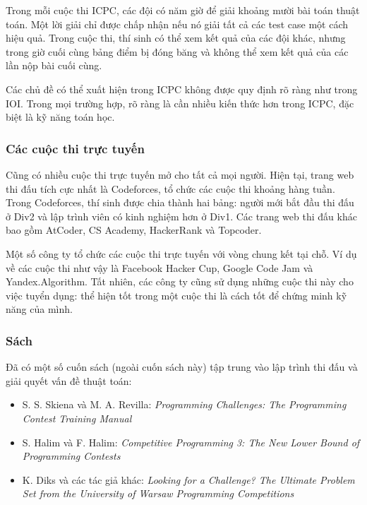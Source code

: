 Trong mỗi cuộc thi ICPC, các đội có năm giờ để
giải khoảng mười bài toán thuật toán.
Một lời giải chỉ được chấp nhận nếu nó giải
tất cả các test case một cách hiệu quả.
Trong cuộc thi, thí sinh có thể xem kết quả của các đội khác,
nhưng trong giờ cuối cùng bảng điểm bị đóng băng và
không thể xem kết quả của các lần nộp bài cuối cùng.

Các chủ đề có thể xuất hiện trong ICPC không được
quy định rõ ràng như trong IOI.
Trong mọi trường hợp, rõ ràng là cần nhiều kiến thức hơn
trong ICPC, đặc biệt là kỹ năng toán học.

\subsubsection{Các cuộc thi trực tuyến}

Cũng có nhiều cuộc thi trực tuyến mở cho tất cả mọi người.
Hiện tại, trang web thi đấu tích cực nhất là Codeforces,
tổ chức các cuộc thi khoảng hàng tuần.
Trong Codeforces, thí sinh được chia thành hai bảng:
người mới bắt đầu thi đấu ở Div2 và lập trình viên có kinh nghiệm hơn ở Div1.
Các trang web thi đấu khác bao gồm AtCoder, CS Academy, HackerRank và Topcoder.

Một số công ty tổ chức các cuộc thi trực tuyến với vòng chung kết tại chỗ.
Ví dụ về các cuộc thi như vậy là Facebook Hacker Cup,
Google Code Jam và Yandex.Algorithm.
Tất nhiên, các công ty cũng sử dụng những cuộc thi này cho việc tuyển dụng:
thể hiện tốt trong một cuộc thi là cách tốt để chứng minh kỹ năng của mình.

\subsubsection{Sách}

Đã có một số cuốn sách (ngoài cuốn sách này) tập trung
vào lập trình thi đấu và giải quyết vấn đề thuật toán:

\begin{itemize}
\item S. S. Skiena và M. A. Revilla:
\emph{Programming Challenges: The Programming Contest Training Manual} \cite{ski03}
\item S. Halim và F. Halim:
\emph{Competitive Programming 3: The New Lower Bound of Programming Contests} \cite{hal13}
\item K. Diks và các tác giả khác: \emph{Looking for a Challenge? The Ultimate Problem Set from
the University of Warsaw Programming Competitions} \cite{dik12}
\end{itemize}

